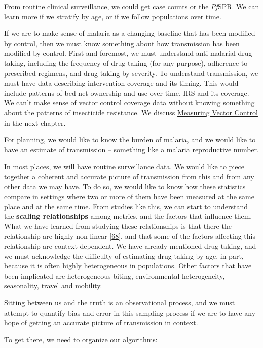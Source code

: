 \documentclass[
]{book}
\begin{document}
From routine clinical surveillance, we could get case counts or the \emph{Pf}SPR. We can learn more if we stratify by age, or if we follow populations over time.

If we are to make sense of malaria as a changing baseline that has been modified by control, then we must know something about how transmission has been modified by control. First and foremost, we must understand anti-malarial drug taking, including the frequency of drug taking (for any purpose), adherence to prescribed regimens, and drug taking by severity. To understand transmission, we must have data describing intervention coverage and its timing. This would include patterns of bed net ownership and use over time, IRS and its coverage. We can't make sense of vector control coverage data without knowing something about the patterns of insecticide resistance. We discuss \protect\hyperlink{measuring-vector-control}{Measuring Vector Control} in the next chapter.

For planning, we would like to know the burden of malaria, and we would like to have an estimate of transmission -- something like a malaria reproductive number.

In most places, we will have routine surveillance data. We would like to piece together a coherent and accurate picture of transmission from this and from any other data we may have. To do so, we would like to know how these statistics compare in settings where two or more of them have been measured at the same place and at the same time. From studies like this, we can start to understand the \textbf{scaling relationships} among metrics, and the factors that influence them. What we have learned from studying these relationships is that there the relationship are highly non-linear {[}\protect\hyperlink{ref-HaySI2008MeasuringMalaria}{68}{]}, and that some of the factors affecting this relationship are context dependent. We have already mentioned drug taking, and we must acknowledge the difficulty of estimating drug taking by age, in part, because it is often highly heterogeneous in populations. Other factors that have been implicated are heterogeneous biting, environmental heterogeneity, seasonality, travel and mobility.

Sitting between us and the truth is an observational process, and we must attempt to quantify bias and error in this sampling process if we are to have any hope of getting an accurate picture of transmission in context.

To get there, we need to organize our algorithms:
\end{document}
